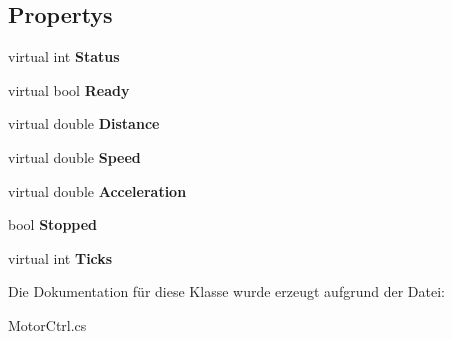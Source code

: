 \subsection*{Propertys}
\begin{DoxyCompactItemize}
\item 
\hypertarget{class_robot_ctrl_1_1_motor_ctrl_ac0f2ebafce89738ca669eaa920a30c80}{
virtual int {\bfseries Status}}
\label{class_robot_ctrl_1_1_motor_ctrl_ac0f2ebafce89738ca669eaa920a30c80}

\item 
\hypertarget{class_robot_ctrl_1_1_motor_ctrl_a1152904081a4c96fa0bf27a6a48e728d}{
virtual bool {\bfseries Ready}}
\label{class_robot_ctrl_1_1_motor_ctrl_a1152904081a4c96fa0bf27a6a48e728d}

\item 
\hypertarget{class_robot_ctrl_1_1_motor_ctrl_a7f1b09f359e4e09c85c9438a5de7dd9b}{
virtual double {\bfseries Distance}}
\label{class_robot_ctrl_1_1_motor_ctrl_a7f1b09f359e4e09c85c9438a5de7dd9b}

\item 
\hypertarget{class_robot_ctrl_1_1_motor_ctrl_a13a5a1ee7896d0557c58ba617af60029}{
virtual double {\bfseries Speed}}
\label{class_robot_ctrl_1_1_motor_ctrl_a13a5a1ee7896d0557c58ba617af60029}

\item 
\hypertarget{class_robot_ctrl_1_1_motor_ctrl_a57bbec274a01f59d5e5ede7599e0ca9f}{
virtual double {\bfseries Acceleration}}
\label{class_robot_ctrl_1_1_motor_ctrl_a57bbec274a01f59d5e5ede7599e0ca9f}

\item 
\hypertarget{class_robot_ctrl_1_1_motor_ctrl_a5d2599ad295ece36d107cc7cb117d9c9}{
bool {\bfseries Stopped}}
\label{class_robot_ctrl_1_1_motor_ctrl_a5d2599ad295ece36d107cc7cb117d9c9}

\item 
\hypertarget{class_robot_ctrl_1_1_motor_ctrl_a625a8335b71115e58d2d04c59027fb81}{
virtual int {\bfseries Ticks}}
\label{class_robot_ctrl_1_1_motor_ctrl_a625a8335b71115e58d2d04c59027fb81}

\end{DoxyCompactItemize}


Die Dokumentation für diese Klasse wurde erzeugt aufgrund der Datei:\begin{DoxyCompactItemize}
\item 
MotorCtrl.cs\end{DoxyCompactItemize}
